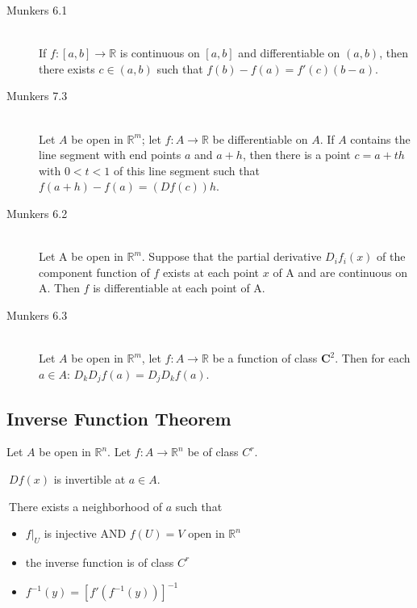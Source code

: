 \begin{description}
	\item[Munkers 6.1] \hfill \\
		If $f:[a,b] \to \mathbb{R}$ is continuous on $[a,b]$ and differentiable on $(a,b)$, then there exists $c \in (a,b)$ such that $f(b)-f(a) = f'(c)(b-a)$.

	\item[Munkers 7.3] \hfill \\
		Let $A$ be open in $\mathbb{R}^m$; let $f:A \to \mathbb{R}$ be differentiable on $A$. If $A$ contains the line segment with end points $a$ and $a+h$, then there is a point $c = a+th$ with $0 < t < 1$ of this line segment such that $f(a+h)-f(a) = (Df(c))h$.		
	\item[Munkers 6.2] \hfill \\
		Let A be open in $\mathbb{R}^m$.
		Suppose that the partial derivative
		$D_if_i(x)$ of the component function
		of $f$ exists at each point $x$ of A and are continuous on A.
		Then $f$ is differentiable at each point of A.
		
	\item[Munkers 6.3] \hfill \\
		Let $A$ be open in $\mathbb{R}^m$, let $f: A \to \mathbb{R}$
		be a function of class $\mathbf{C}^2$. Then for each $a\in A$:
		$D_kD_jf(a)=D_jD_kf(a)$.
\end{description}

\subsection{Inverse Function Theorem}
\label{thm_ivft}
Let $A$ be open in $\mathbb{R}^n$.
	Let $f:A\to\mathbb{R}^n$ be of class $C^r$.

\thmIF
	$\ Df(x)$ is invertible at $a\in A$.
	
\thmTHEN
	$\ $There exists a neighborhood of $a$ such that
\begin{itemize}
	\item $f|_U$ is injective AND $f(U)=V$ open in $\mathbb{R}^n$
	\item the inverse function is of class $C^r$
	\item $f^{-1}(y)=[f'(f^{-1}(y))]^{-1}$
\end{itemize}


